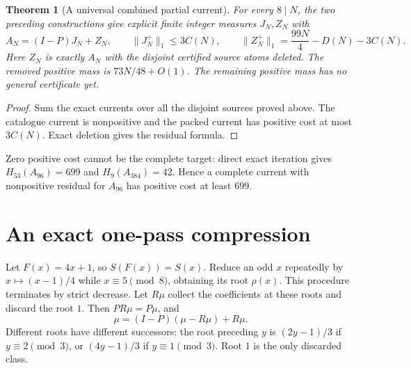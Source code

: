 \documentclass[11pt]{article}
\newtheorem{theorem}{Theorem}
\begin{document}
\begin{theorem}[A universal combined partial current]\label{thm:partial}
For every $8\mid N$, the two preceding constructions give explicit
finite integer measures $J_N,Z_N$ with
\[
A_N=(I-P)J_N+Z_N,\qquad
\|J_N^+\|_1\le3C(N),\qquad
\|Z_N^+\|_1=\frac{99N}{4}-D(N)-3C(N).
\]
Here $Z_N$ is exactly $A_N$ with the disjoint certified source atoms
deleted. The removed positive mass is $73N/48+O(1)$.
The remaining positive mass has no general certificate yet.
\end{theorem}
\begin{proof}
Sum the exact currents over all the disjoint sources proved above.
The catalogue current is nonpositive and the packed current has positive
cost at most $3C(N)$. Exact deletion gives the residual formula.
\end{proof}
Zero positive cost cannot be the complete target: direct exact iteration
gives $H_{53}(A_{96})=699$ and $H_9(A_{384})=42$. Hence a complete
current with nonpositive residual for $A_{96}$ has positive cost at least
$699$.

\section{An exact one-pass compression}
Let $F(x)=4x+1$, so $S(F(x))=S(x)$. Reduce an odd $x$ repeatedly by
$x\mapsto(x-1)/4$ while $x\equiv5\pmod8$, obtaining its root $\rho(x)$.
This procedure terminates by strict decrease. Let $R\mu$ collect the
coefficients at these roots and discard the root $1$.
Then $PR\mu=P\mu$, and
\[
\mu=(I-P)(\mu-R\mu)+R\mu.                              \tag{11}
\]
Different roots have different successors: the root preceding $y$ is
$(2y-1)/3$ if $y\equiv2\pmod3$, or $(4y-1)/3$ if
$y\equiv1\pmod3$. Root $1$ is the only discarded class.
\end{document}
